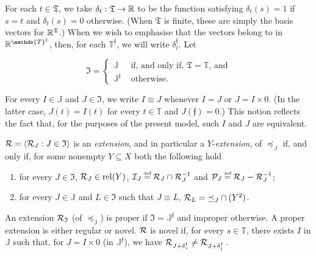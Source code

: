 \documentclass[12pt,a4paper,twoside]{article}
\newcommand{\relations}{\operatorname{rel}}
\newcommand{\novel}{\mathfrak f}
\newcommand{\preceqb}{\mathbin{\preceq}}
\newcommand{\ext}{\mathrel{\mc R}}
\newcommand{\extb}{\mathbin{\mc R}}
\newcommand{\sextb}{\mathbin{\mc P}}
\newcommand{\nextb}{\mathbin{\mc I}}
\newcommand{\mbbt}{{\mathds {T}}}
\newcommand{\mbbtp}{{\mathds{T} ^ \novel }}
\newcommand{\mbbtpp}{{\mathfrak{T}}}
\newcommand{\mbbj}{\mathds J}
\newcommand{\mbbjp}{{\mathds {J}^{\novel}}}
\newcommand{\mbbjpp}{\mathfrak I}
\begin{document}
\begin{appendices}
For each $t \in \mbbtpp$, we take  $\delta_{t} : \mbbtpp \rightarrow \R$ to be
the function satisfying $ \delta_{t} ( s ) = 1 $ if $ s = t $ and $ \delta_{t} ( s ) = 0 $
otherwise. (When $\mbbtpp$ is finite, these are simply the basis vectors for $\R^{\mbbtpp}$.)  When we wish to emphasise that the  vectors belong to in
$\R^{\mbbtp}$, then, for each $\mbbtp $, we will write $\delta_{t} ^{ \novel }$.
Let
\begin{linenomath*}
\begin{equation*}
 \mbbjpp  = \left \{
\begin{array}{ll}
\mbbj & \text{ if, and only if, $\mbbtpp = \mbbt$, and}    \\
 \mbbjp & \text{ otherwise.}
\end{array}\right.
\end{equation*}
\end{linenomath*}
For every $I \in \mbbj$ and $J \in \mbbjpp$, we write $I \equiv J $ whenever
$I = J $ or $J = I\times 0 $. (In the latter case, $J(t)= I(t)$ for every
$t\in \mbbt$ and $J(\novel )= 0 $.) This notion reflects the fact that, for the purposes
of the present model, such $I $ and $J$ are equivalent.
\begin{definition}\label{def-extensionQ}
 
$\extb =\langle \extb_{J}: J \in \mbbjpp \rangle$ is an
  \emph{extension}, and in particular a $Y$-\emph{extension}, of
  $ \preceqb _{ \mbbj }$ if, and only if, for some nonempty
  $ Y \subseteq X $ both the following hold
\begin{enumerate}

\item for every $J\in \mbbjpp$, $\extb_{J}\in \relations(Y)$,
  $ \nextb_{J} \defeq \extb_{J} \cap \extb_{J} ^ { -1 }$ and
  $ \sextb_{J} \defeq \extb_{J} \bs \extb_{J} ^ { -1 } $$;$

\item for every $ J \in \mbbj $ and $ L \in \mbbjpp $ such that $J \equiv
  L$, $\extb_{L} = \preceqb_{J} \cap (Y ^ 2) $. \label{item-preservingQ}
\end{enumerate}
An extension $\ext_{\mbbjpp}$ (of $\preceq_{\mbbj}$) is proper if $\mbbjpp=
\mbbjp$ and improper otherwise.  A proper extension is either regular or
novel. $\ext$ is novel if, for every $ s \in \mbbt $, there exists $ I $ in $
\mbbj$ such that, for $ J = I \times 0 $ (in $\mbbjp$), we have $\extb _ { J +
  \delta _{s} ^{ \novel } } \neq \extb _ { J + \delta _ { \novel} ^{ \novel }
}$\,.
 \end{definition} 


\end{appendices}
\end{document}
